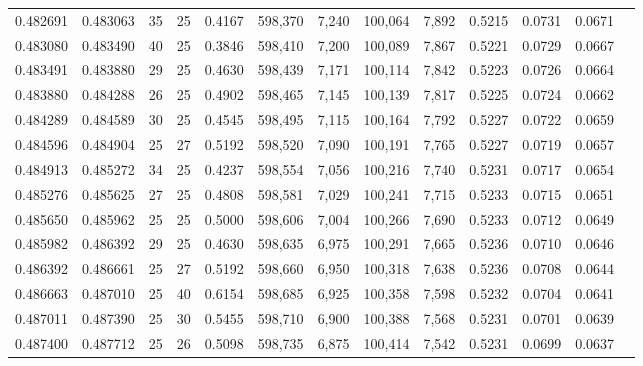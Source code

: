 \begin{tabular}{rrrrrrrrrrrrr}
0.482691 & 0.483063 &    35 &  25 &                                     0.4167 & 598,370 &   7,240 & 100,064 &   7,892 & 0.5215 & 0.0731 & 0.0671 \\
0.483080 & 0.483490 &    40 &  25 &                                     0.3846 & 598,410 &   7,200 & 100,089 &   7,867 & 0.5221 & 0.0729 & 0.0667 \\
0.483491 & 0.483880 &    29 &  25 &                                     0.4630 & 598,439 &   7,171 & 100,114 &   7,842 & 0.5223 & 0.0726 & 0.0664 \\
0.483880 & 0.484288 &    26 &  25 &                                     0.4902 & 598,465 &   7,145 & 100,139 &   7,817 & 0.5225 & 0.0724 & 0.0662 \\
0.484289 & 0.484589 &    30 &  25 &                                     0.4545 & 598,495 &   7,115 & 100,164 &   7,792 & 0.5227 & 0.0722 & 0.0659 \\
0.484596 & 0.484904 &    25 &  27 &                                     0.5192 & 598,520 &   7,090 & 100,191 &   7,765 & 0.5227 & 0.0719 & 0.0657 \\
0.484913 & 0.485272 &    34 &  25 &                                     0.4237 & 598,554 &   7,056 & 100,216 &   7,740 & 0.5231 & 0.0717 & 0.0654 \\
0.485276 & 0.485625 &    27 &  25 &                                     0.4808 & 598,581 &   7,029 & 100,241 &   7,715 & 0.5233 & 0.0715 & 0.0651 \\
0.485650 & 0.485962 &    25 &  25 &                                     0.5000 & 598,606 &   7,004 & 100,266 &   7,690 & 0.5233 & 0.0712 & 0.0649 \\
0.485982 & 0.486392 &    29 &  25 &                                     0.4630 & 598,635 &   6,975 & 100,291 &   7,665 & 0.5236 & 0.0710 & 0.0646 \\
0.486392 & 0.486661 &    25 &  27 &                                     0.5192 & 598,660 &   6,950 & 100,318 &   7,638 & 0.5236 & 0.0708 & 0.0644 \\
0.486663 & 0.487010 &    25 &  40 &                                     0.6154 & 598,685 &   6,925 & 100,358 &   7,598 & 0.5232 & 0.0704 & 0.0641 \\
0.487011 & 0.487390 &    25 &  30 &                                     0.5455 & 598,710 &   6,900 & 100,388 &   7,568 & 0.5231 & 0.0701 & 0.0639 \\
0.487400 & 0.487712 &    25 &  26 &                                     0.5098 & 598,735 &   6,875 & 100,414 &   7,542 & 0.5231 & 0.0699 & 0.0637 \\

\end{tabular}
